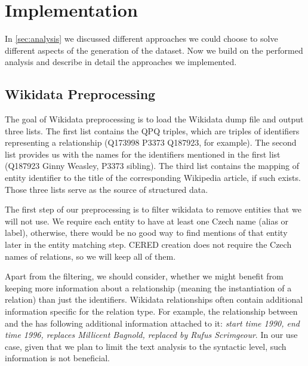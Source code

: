 \section{Implementation}

In \autoref{sec:analysis} we discussed different approaches we could choose to solve different aspects of the generation of the dataset. Now we build on the performed analysis and describe in detail the approaches we implemented.


\subsection{Wikidata Preprocessing}
\label{sec:wikidata_preprocessing_implementation}
The goal of Wikidata preprocessing is to load the Wikidata dump file and output three lists. The first list contains the QPQ triples, which are triples of identifiers representing a relationship (Q173998 P3373 Q187923, for example). The second list provides us with the names for the identifiers mentioned in the first list (Q187923 Ginny Weasley, P3373 sibling). The third list contains the mapping of entity identifier to the title of the corresponding Wikipedia article, if such exists. Those three lists serve as the source of structured data.

The first step of our preprocessing is to filter wikidata to remove entities that we will not use. We require each entity to have at least one Czech name (alias or label), otherwise, there would be no good way to find mentions of that entity later in the entity matching step. CERED creation does not require the Czech names of relations, so we will keep all of them.

Apart from the filtering, we should consider, whether we might benefit from keeping more information about a relationship (meaning the instantiation of a relation) than just the identifiers. Wikidata relationships often contain additional information specific for the relation type. For example, the  relationship between  and the  has following additional information attached to it: \textit{start time 1990, end time 1996, replaces Millicent Bagnold, replaced by Rufus Scrimgeour}. In our use case, given that we plan to limit the text analysis to the syntactic level, such information is not beneficial. 

